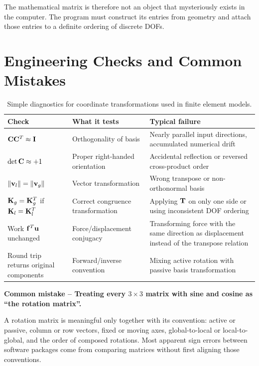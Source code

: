 The mathematical matrix is therefore not an object that mysteriously exists in
the computer. The program must construct its entries from geometry and attach
those entries to a definite ordering of discrete DOFs.

\section{Engineering Checks and Common Mistakes}

\begin{table}[ht]
\centering
\renewcommand{\arraystretch}{1.2}
\begin{tabular}{|p{}|p{}|p{}|}
\hline
\textbf{Check} & \textbf{What it tests} & \textbf{Typical failure}\\ \hline
$\mathbf{C}\mathbf{C}^{T}\approx\mathbf{I}$ & Orthogonality of basis & Nearly parallel input directions, accumulated numerical drift\\ \hline
$\det\mathbf{C}\approx+1$ & Proper right-handed orientation & Accidental reflection or reversed cross-product order\\ \hline
$\| {\mathbf{v}_l} \|=\| {\mathbf{v}_g} \|$ & Vector transformation & Wrong transpose or non-orthonormal basis\\ \hline
$\mathbf{K}_g=\mathbf{K}_g^T$ if $\mathbf{K}_l=\mathbf{K}_l^T$ & Correct congruence transformation & Applying $\mathbf{T}$ on only one side or using inconsistent DOF ordering\\ \hline
Work $\mathbf{f}^T\mathbf{u}$ unchanged & Force/displacement conjugacy & Transforming force with the same direction as displacement instead of the transpose relation\\ \hline
Round trip returns original components & Forward/inverse convention & Mixing active rotation with passive basis transformation\\ \hline
\end{tabular}
\caption{Simple diagnostics for coordinate transformations used in finite element models.}
\label{tab:coord-checks}
\end{table}

\begin{bbox}
\textbf{Common mistake -- Treating every $3\times3$ matrix with sine and cosine as
``the rotation matrix''.}

A rotation matrix is meaningful only together with its convention: active or
passive, column or row vectors, fixed or moving axes, global-to-local or
local-to-global, and the order of composed rotations. Most apparent sign errors
between software packages come from comparing matrices without first aligning
those conventions.
\end{bbox}

